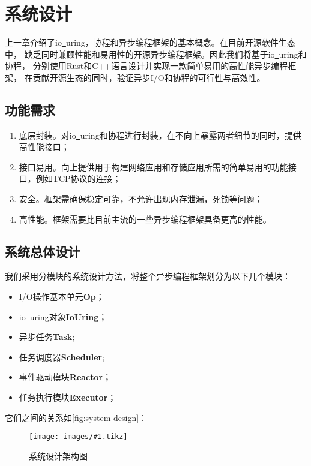 \documentclass[supercite]{HustGraduPaper}
\newcommand{\cfig}[3]{
  \begin{figure}[htb]
    \centering
    \texttt{[image: images/\#1.tikz]}
    \caption{#3}
    \label{fig:#1}
  \end{figure}
}
\newcommand{\rfig}[1]{\autoref{fig:#1}}
\theoremstyle{definition}
\begin{document}
\section{系统设计}
上一章介绍了io\underline{~}uring，协程和异步编程框架的基本概念。在目前开源软件生态中，
缺乏同时兼顾性能和易用性的开源异步编程框架。因此我们将基于io\underline{~}uring和协程，
分别使用Rust和C++语言设计并实现一款简单易用的高性能异步编程框架，
在贡献开源生态的同时，验证异步I/O和协程的可行性与高效性。\par

\subsection{功能需求}

\begin{enumerate}
  \item 底层封装。对io\underline{~}uring和协程进行封装，在不向上暴露两者细节的同时，提供高性能接口；
  \item 接口易用。向上提供用于构建网络应用和存储应用所需的简单易用的功能接口，例如TCP协议的连接；
  \item 安全。框架需确保稳定可靠，不允许出现内存泄漏，死锁等问题；
  \item 高性能。框架需要比目前主流的一些异步编程框架具备更高的性能。
\end{enumerate}

\subsection{系统总体设计}

我们采用分模块的系统设计方法，将整个异步编程框架划分为以下几个模块：

\begin{itemize}
  \item I/O操作基本单元\textbf{Op}；
  \item io\underline{~}uring对象\textbf{IoUring}；
  \item 异步任务\textbf{Task};
  \item 任务调度器\textbf{Scheduler};
  \item 事件驱动模块\textbf{Reactor}；
  \item 任务执行模块\textbf{Executor}；
\end{itemize}

它们之间的关系如\rfig{system-design}：\par

\cfig{system-design}{0.9}{系统设计架构图}
\end{document}
